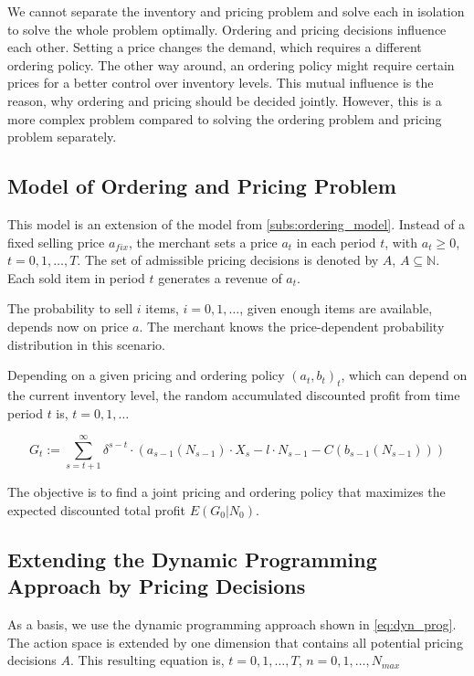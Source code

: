 We cannot separate the inventory and pricing problem and solve each in isolation to solve the whole problem optimally.
Ordering and pricing decisions influence each other.
Setting a price changes the demand, which requires a different ordering policy.
The other way around, an ordering policy might require certain prices for a better control over inventory levels.
This mutual influence is the reason, why ordering and pricing should be decided jointly.
However, this is a more complex problem compared to solving the ordering problem and pricing problem separately.

\subsection{Model of Ordering and Pricing Problem}
\label{subs:joint_model}
This model is an extension of the model from \cref{subs:ordering_model}.
Instead of a fixed selling price $a_{fix}$, the merchant sets a price $a_t$ in each period $t$, with $a_t \geq 0$, $t=0,1,\ldots,T$.
The set of admissible pricing decisions is denoted by $A$, $A \subseteq  \mathbb{N}$.
Each sold item in period $t$ generates a revenue of $a_t$.

The probability to sell $i$ items, $i=0,1,\ldots$, given enough items are available, depends now on price $a$.
The merchant knows the price-dependent probability distribution in this scenario.

Depending on a given pricing and ordering policy $(a_t, b_t)_t$, which can depend on the current inventory level, the random accumulated discounted profit from time period $t$ is, $t=0,1,\ldots$

$$
G_t := \sum_{s=t+1}^{\infty} \delta^{s-t} \cdot (a_{s-1}(N_{s-1}) \cdot X_s - l \cdot N_{s-1} - C(b_{s-1}(N_{s-1})))
$$

The objective is to find a joint pricing and ordering policy that maximizes the expected discounted total profit $E(G_0 | N_0)$.

\subsection{Extending the Dynamic Programming Approach by Pricing Decisions}
\label{section:joint_solution}
As a basis, we use the dynamic programming approach shown in \cref{eq:dyn_prog}.
The action space is extended by one dimension that contains all potential pricing decisions $A$.
This resulting equation is, $t=0, 1, \ldots,T$, $n = 0,1,\ldots,N_{max}$

